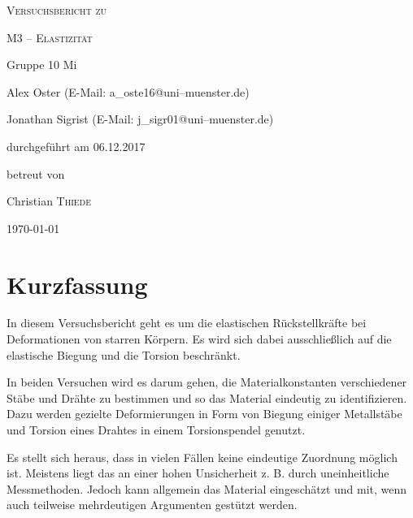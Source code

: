 \documentclass[11pt,a4paper,titlepage, ngerman]{article}
\begin{document}
	\begin{titlepage}
		\centering
		{\scshape\LARGE Versuchsbericht zu \par}
		\vspace{1cm}
		{\scshape\huge M3 -- Elastizität\par}
		\vspace{2.5cm}
		{\LARGE Gruppe 10 Mi\par}
		\vspace{0.5cm}
		{\large Alex Oster (E-Mail: a\_oste16@uni--muenster.de) \par}
		{\large Jonathan Sigrist (E-Mail: j\_sigr01@uni--muenster.de) \par}
		\vfill
		durchgeführt am 06.12.2017\par
		betreut von\par
		{\large Christian \textsc{Thiede}}
		\vfill	
		{\large \today\par}
	\end{titlepage}
	
	\tableofcontents
	
	\newpage
	
	\section{Kurzfassung}
	
	In diesem Versuchsbericht geht es um die elastischen Rückstellkräfte bei Deformationen von starren Körpern.
	Es wird sich dabei ausschließlich auf die elastische Biegung und die Torsion beschränkt.
	
	In beiden Versuchen wird es darum gehen, die Materialkonstanten verschiedener Stäbe und Drähte zu bestimmen und so das Material eindeutig zu identifizieren.
	Dazu werden gezielte Deformierungen in Form von Biegung einiger Metallstäbe und Torsion eines Drahtes in einem Torsionspendel genutzt.
	
	Es stellt sich heraus, dass in vielen Fällen keine eindeutige Zuordnung möglich ist.
	Meistens liegt das an einer hohen Unsicherheit z. B. durch uneinheitliche Messmethoden.
	Jedoch kann allgemein das Material eingeschätzt und mit, wenn auch teilweise mehrdeutigen Argumenten gestützt werden.
	\vspace{2cm}	
	
	
	\newpage
	
	
	
\end{document}
